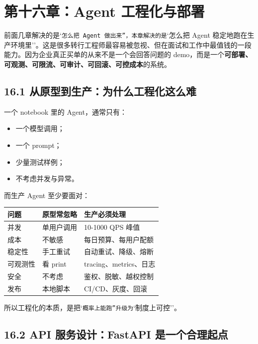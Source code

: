 \chapter{第十六章：Agent 工程化与部署}

前面几章解决的是`\texttt{怎么把 Agent 做出来''，本章解决的是}`怎么把 Agent 稳定地跑在生产环境里''。这是很多转行工程师最容易被忽视、但在面试和工作中最值钱的一段能力。因为企业真正买单的从来不是一个会回答问题的 demo，而是一个\textbf{可部署、可观测、可限流、可审计、可回滚、可控成本}的系统。


\section{16.1 从原型到生产：为什么工程化这么难}

一个 notebook 里的 Agent，通常只有：


\begin{itemize}[leftmargin=2em]
\item 一个模型调用；
\item 一个 prompt；
\item 少量测试样例；
\item 不考虑并发与异常。
\end{itemize}

而生产 Agent 至少要面对：


\begingroup
\scriptsize
\setlength{\tabcolsep}{3pt}
\begin{longtable}{|p{}|p{}|p{}|}
\hline
问题 & 原型常忽略 & 生产必须处理 \\ \hline
并发 & 单用户调用 & 10-1000 QPS 峰值 \\ \hline
成本 & 不敏感 & 每日预算、每用户配额 \\ \hline
稳定性 & 手工重试 & 自动重试、降级、熔断 \\ \hline
可观测性 & 看 print & tracing、metrics、日志 \\ \hline
安全 & 不考虑 & 鉴权、脱敏、越权控制 \\ \hline
发布 & 本地脚本 & CI/CD、灰度、回滚 \\ \hline
\end{longtable}
\endgroup

所以工程化的本质，是把`\texttt{概率上能跑''升级为}`制度上可控''。


\section{16.2 API 服务设计：FastAPI 是一个合理起点}


